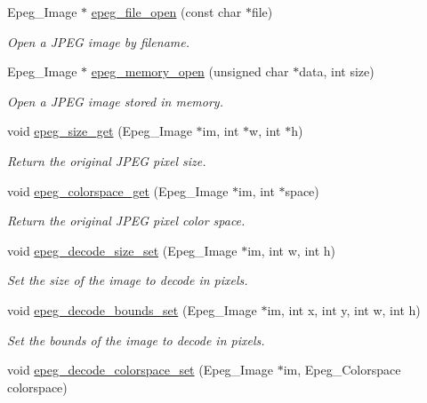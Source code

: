 \begin{DoxyCompactItemize}
\item 
Epeg\+\_\+\+Image $\ast$ \hyperlink{epeg_8c_a8295f48501747f18cbb74e4eb1c55836}{epeg\+\_\+file\+\_\+open} (const char $\ast$file)
\begin{DoxyCompactList}\small\item\em Open a J\+P\+E\+G image by filename. \end{DoxyCompactList}\item 
Epeg\+\_\+\+Image $\ast$ \hyperlink{epeg_8c_a55d449402ab7ad9de9febd63b858a2dc}{epeg\+\_\+memory\+\_\+open} (unsigned char $\ast$data, int size)
\begin{DoxyCompactList}\small\item\em Open a J\+P\+E\+G image stored in memory. \end{DoxyCompactList}\item 
void \hyperlink{epeg_8c_a3b8680bdbf470d1a634618e5308ce147}{epeg\+\_\+size\+\_\+get} (Epeg\+\_\+\+Image $\ast$im, int $\ast$w, int $\ast$h)
\begin{DoxyCompactList}\small\item\em Return the original J\+P\+E\+G pixel size. \end{DoxyCompactList}\item 
void \hyperlink{epeg_8c_a290a722dddc53761d213524ce0e89284}{epeg\+\_\+colorspace\+\_\+get} (Epeg\+\_\+\+Image $\ast$im, int $\ast$space)
\begin{DoxyCompactList}\small\item\em Return the original J\+P\+E\+G pixel color space. \end{DoxyCompactList}\item 
void \hyperlink{epeg_8c_a800dc04316740427b1f4366d973ff4e4}{epeg\+\_\+decode\+\_\+size\+\_\+set} (Epeg\+\_\+\+Image $\ast$im, int w, int h)
\begin{DoxyCompactList}\small\item\em Set the size of the image to decode in pixels. \end{DoxyCompactList}\item 
void \hyperlink{epeg_8c_ab840f7b7ea8c21938a5210dee06e9dda}{epeg\+\_\+decode\+\_\+bounds\+\_\+set} (Epeg\+\_\+\+Image $\ast$im, int x, int y, int w, int h)
\begin{DoxyCompactList}\small\item\em Set the bounds of the image to decode in pixels. \end{DoxyCompactList}\item 
void \hyperlink{epeg_8c_afe41e06c6667542ad4685730538e03f7}{epeg\+\_\+decode\+\_\+colorspace\+\_\+set} (Epeg\+\_\+\+Image $\ast$im, Epeg\+\_\+\+Colorspace colorspace)

\end{DoxyCompactItemize}
